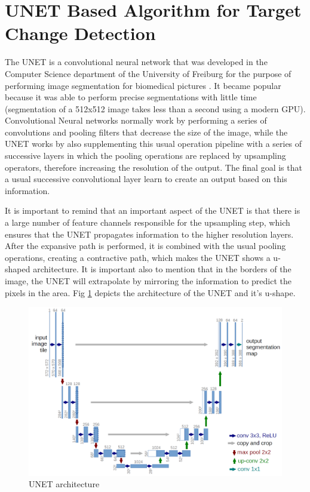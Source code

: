 \section{UNET Based Algorithm for Target Change Detection}
The UNET is a convolutional neural network that was developed in the Computer Science department of the University of Freiburg for the purpose of performing image segmentation for
biomedical pictures \cite{Unet}. It became popular because it was able to perform precise segmentations with little time (segmentation of a 512x512 image takes less than a second using a modern GPU).
Convolutional Neural networks normally work by performing a series of convolutions and pooling filters that decrease the size of the image, while the UNET works by also 
supplementing this usual operation pipeline with a series of successive layers in which the pooling operations are replaced by upsampling operators, therefore increasing the resolution of the output.
The final goal is that a usual successive convolutional layer learn to create an output based on this information. 

It is important to remind that an important aspect of the UNET is that there is a large number of feature channels responsible for the upsampling step, which ensures that the UNET propagates information
to the higher resolution layers. After the expansive path is performed, it is combined with the usual pooling operations, creating a contractive path, which makes the UNET shows a u-shaped architecture. 
It is important also to mention that in the borders of the image, the UNET will extrapolate by mirroring the information to predict the pixels in the area. 
Fig \ref{fig:unet_architecture} depicts the architecture of the UNET and it's u-shape.

\begin{figure}[ht]
    \centering
    \includegraphics[width=0.7\linewidth]{Chapter7/unet_architecture.png}
    \caption{UNET architecture}
    \label{fig:unet_architecture}
\end{figure}


